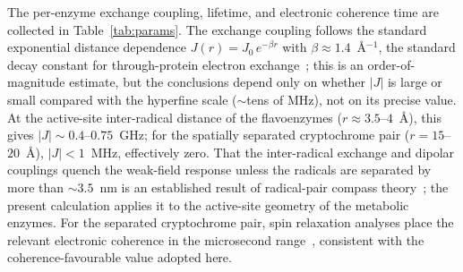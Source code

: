 \documentclass[twoside,twocolumn,9pt]{article}
\begin{document}
The per-enzyme exchange coupling, lifetime, and electronic coherence time are
collected in Table~\ref{tab:params}. The exchange coupling follows the standard
exponential distance dependence $J(r) = J_0\,e^{-\beta r}$ with
$\beta\approx1.4$~\AA$^{-1}$, the standard decay constant for through-protein
electron exchange~\cite{Efimova2008,Moser1992}; this is an order-of-magnitude
estimate, but the
conclusions depend only on whether $|J|$ is large or small compared with the
hyperfine scale ($\sim$tens of MHz), not on its precise value. At the
active-site inter-radical distance of the flavoenzymes ($r\approx3.5$--$4$~\AA),
this gives $|J|\sim0.4$--$0.75$~GHz; for the spatially separated cryptochrome
pair ($r = 15$--$20$~\AA), $|J| < 1$~MHz, effectively zero. That the
inter-radical exchange and dipolar couplings quench the weak-field response
unless the radicals are separated by more than $\sim$$3.5$~nm is an established
result of radical-pair compass theory~\cite{Efimova2008}; the present
calculation applies it to the active-site geometry of the metabolic enzymes. For
the separated cryptochrome pair, spin relaxation analyses place the relevant
electronic coherence in the microsecond range~\cite{Kattnig2016}, consistent
with the coherence-favourable value adopted here.
\end{document}
